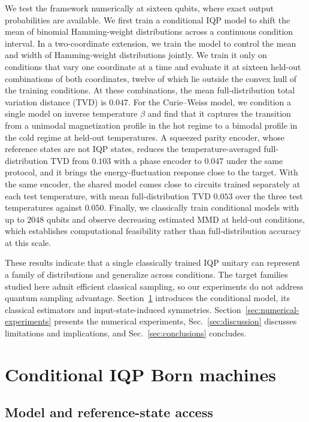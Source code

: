\documentclass[pra,aps,10pt,twocolumn,floatfix,superscriptaddress, notitlepage,longbibliography]{revtex4-2}
\begin{document}
We test the framework numerically at sixteen qubits, where exact output probabilities are available. We first train a conditional IQP model to shift the mean of binomial Hamming-weight distributions across a continuous condition interval. In a two-coordinate extension, we train the model to control the mean and width of Hamming-weight distributions jointly. We train it only on conditions that vary one coordinate at a time and evaluate it at sixteen held-out combinations of both coordinates, twelve of which lie outside the convex hull of the training conditions. At these combinations, the mean full-distribution total variation distance (TVD) is $0.047$. For the Curie--Weiss model, we condition a single model on inverse temperature $\beta$ and find that it captures the transition from a unimodal magnetization profile in the hot regime to a bimodal profile in the cold regime at held-out temperatures. A squeezed parity encoder, whose reference states are not IQP states, reduces the temperature-averaged full-distribution TVD from $0.103$ with a phase encoder to $0.047$ under the same protocol, and it brings the energy-fluctuation response close to the target. With the same encoder, the shared model comes close to circuits trained separately at each test temperature, with mean full-distribution TVD $0.053$ over the three test temperatures against $0.050$. Finally, we classically train conditional models with up to $2048$ qubits and observe decreasing estimated MMD at held-out conditions, which establishes computational feasibility rather than full-distribution accuracy at this scale.

These results indicate that a single classically trained IQP unitary can represent a family of distributions and generalize across conditions. The target families studied here admit efficient classical sampling, so our experiments do not address quantum sampling advantage. Section~\ref{sec:cond_model} introduces the conditional model, its classical estimators and input-state-induced symmetries. Section~\ref{sec:numerical-experiments} presents the numerical experiments, Sec.~\ref{sec:discussion} discusses limitations and implications, and Sec.~\ref{sec:conclusions} concludes.

\section{Conditional IQP Born machines}
\label{sec:cond_model}

\subsection{Model and reference-state access}
\label{sec:model-access}
\end{document}
